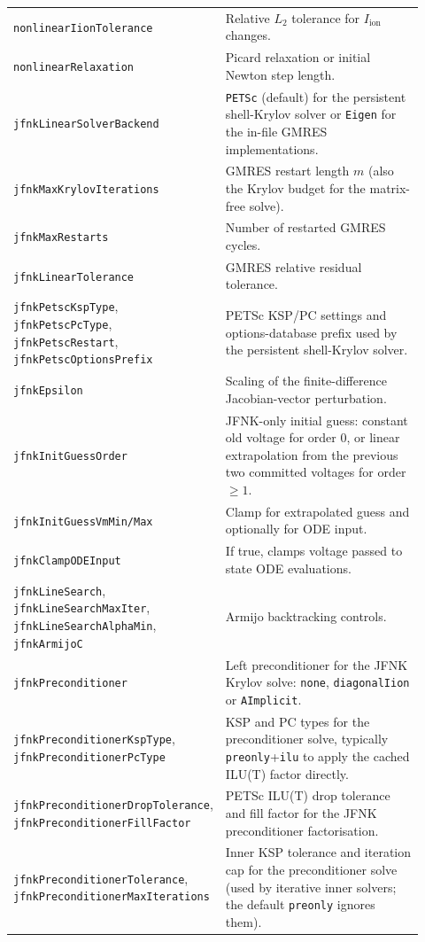 \documentclass[11pt,a4paper]{article}
\newcommand{\code}[1]{\texttt{\small #1}}
\newcommand{\Iion}{I_{\mathrm{ion}}}
\begin{document}
\begin{longtable}{@{}p{0.34\linewidth}p{0.58\linewidth}@{}}
\code{nonlinearIionTolerance} & Relative $L_2$ tolerance for $\Iion$ changes. \\
\code{nonlinearRelaxation} & Picard relaxation or initial Newton step length. \\
\code{jfnkLinearSolverBackend} & \code{PETSc} (default) for the persistent shell-Krylov solver or \code{Eigen} for the in-file GMRES implementations. \\
\code{jfnkMaxKrylovIterations} & GMRES restart length $m$ (also the Krylov budget for the matrix-free solve). \\
\code{jfnkMaxRestarts} & Number of restarted GMRES cycles. \\
\code{jfnkLinearTolerance} & GMRES relative residual tolerance. \\
\code{jfnkPetscKspType}, \code{jfnkPetscPcType}, \code{jfnkPetscRestart}, \code{jfnkPetscOptionsPrefix} & PETSc KSP/PC settings and options-database prefix used by the persistent shell-Krylov solver. \\
\code{jfnkEpsilon} & Scaling of the finite-difference Jacobian-vector perturbation. \\
\code{jfnkInitGuessOrder} & JFNK-only initial guess: constant old voltage for order 0, or linear extrapolation from the previous two committed voltages for order $\ge 1$. \\
\code{jfnkInitGuessVmMin/Max} & Clamp for extrapolated guess and optionally for ODE input. \\
\code{jfnkClampODEInput} & If true, clamps voltage passed to state ODE evaluations. \\
\code{jfnkLineSearch}, \code{jfnkLineSearchMaxIter}, \code{jfnkLineSearchAlphaMin}, \code{jfnkArmijoC} & Armijo backtracking controls. \\
\code{jfnkPreconditioner} & Left preconditioner for the JFNK Krylov solve: \code{none}, \code{diagonalIion} or \code{AImplicit}. \\
\code{jfnkPreconditionerKspType}, \code{jfnkPreconditionerPcType} & KSP and PC types for the preconditioner solve, typically \code{preonly}+\code{ilu} to apply the cached ILU(T) factor directly. \\
\code{jfnkPreconditionerDropTolerance}, \code{jfnkPreconditionerFillFactor} & PETSc ILU(T) drop tolerance and fill factor for the JFNK preconditioner factorisation. \\
\code{jfnkPreconditionerTolerance}, \code{jfnkPreconditionerMaxIterations} & Inner KSP tolerance and iteration cap for the preconditioner solve (used by iterative inner solvers; the default \code{preonly} ignores them). \\

\end{longtable}
\end{document}

